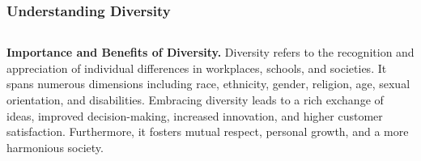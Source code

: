 \documentclass[5pt]{beamer}
\begin{document}
\begin{frame}
\frametitle{Understanding Diversity}
\begin{columns}
\begin{column}{0.7\textwidth}
\begin{block}{\textbf{Importance and Benefits of Diversity.}}
Diversity refers to the recognition and appreciation of individual differences in workplaces, schools, and societies. It spans numerous dimensions including race, ethnicity, gender, religion, age, sexual orientation, and disabilities. Embracing diversity leads to a rich exchange of ideas, improved decision-making, increased innovation, and higher customer satisfaction. Furthermore, it fosters mutual respect, personal growth, and a more harmonious society.
\end{block}
\end{column}
\end{columns}
\end{frame}
\end{document}
